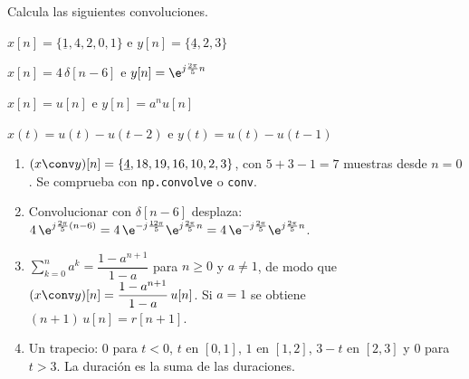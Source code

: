 \documentclass[11pt,a4paper]{scrartcl}
\begin{document}
\begin{ejercicio}[convolución]
  Calcula las siguientes convoluciones.
  \begin{incisos}[2]
    \item $x[n]=\{\underline{1},4,2,0,1\}$ e $y[n]=\{\underline{4},2,3\}$
    \item $x[n]=4\,\delta[n-6]$ e $y[n]=\e^{j\frac{2\pi}{5}n}$
    \item $x[n]=u[n]$ e $y[n]=a^n u[n]$
    \item $x(t)=u(t)-u(t-2)$ e $y(t)=u(t)-u(t-1)$
  \end{incisos}
\end{ejercicio}
\begin{solucion}
  \begin{enumerate}[label=\alph*)]
    \item $(x\conv y)[n]=\{\underline{4},18,19,16,10,2,3\}$, con $5+3-1=7$ muestras desde $n=0$. Se comprueba con \texttt{np.convolve} o \texttt{conv}.
    \item Convolucionar con $\delta[n-6]$ desplaza: $4\,\e^{j\frac{2\pi}{5}(n-6)}=4\,\e^{-j\frac{12\pi}{5}}\e^{j\frac{2\pi}{5}n}=4\,\e^{-j\frac{2\pi}{5}}\e^{j\frac{2\pi}{5}n}$.
    \item $\sum_{k=0}^{n}a^k=\dfrac{1-a^{n+1}}{1-a}$ para $n\ge0$ y $a\ne1$, de modo que $(x\conv y)[n]=\dfrac{1-a^{n+1}}{1-a}\,u[n]$. Si $a=1$ se obtiene $(n+1)\,u[n]=r[n+1]$.
    \item Un trapecio: $0$ para $t<0$, $t$ en $[0,1]$, $1$ en $[1,2]$, $3-t$ en $[2,3]$ y $0$ para $t>3$. La duración es la suma de las duraciones.
  \end{enumerate}
\end{solucion}
\end{document}

